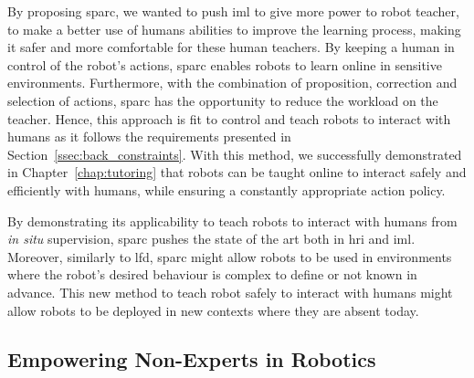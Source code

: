 By proposing \gls{sparc}, we wanted to push \gls{iml} to give more power to robot teacher, to make a better use of humans abilities to improve the learning process, making it safer and more comfortable for these human teachers. By keeping a human in control of the robot's actions, \gls{sparc} enables robots to learn online in sensitive environments. %
Furthermore, with the combination of proposition, correction and selection of actions, \gls{sparc} has the opportunity to reduce the workload on the teacher. Hence, this approach is fit to control and teach robots to interact with humans as it follows the requirements presented in Section~\ref{ssec:back_constraints}. With this method, we successfully demonstrated in Chapter~\ref{chap:tutoring} that robots can be taught online to interact safely and efficiently with humans, while ensuring a constantly appropriate action policy. 

By demonstrating its applicability to teach robots to interact with humans from \textit{in situ}  supervision, \gls{sparc} pushes the state of the art both in \gls{hri} and \gls{iml}. Moreover, similarly to \gls{lfd}, \gls{sparc} might allow robots to be used in environments where the robot's desired behaviour is complex to define or not known in advance. This new method to teach robot safely to interact with humans might allow robots to be deployed in new contexts where they are absent today.


\subsection{Empowering Non-Experts in Robotics}


